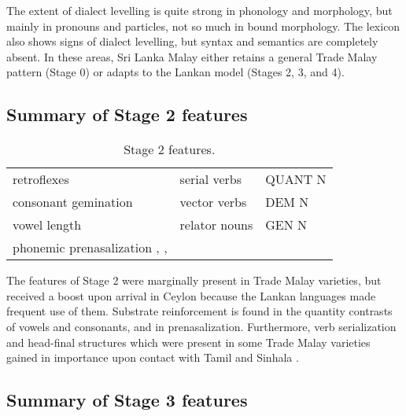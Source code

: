 The extent of dialect levelling is quite strong in phonology and morphology, but mainly in pronouns and particles, not so much in bound morphology. The lexicon also shows signs of dialect levelling, but syntax and semantics are completely absent. In these areas, Sri Lanka Malay either retains a general Trade Malay pattern (Stage 0) or   adapts to the Lankan model (Stages 2, 3, and 4).


\subsection{Summary of Stage 2 features}

\begin{table}[h!]
\centering
\begin{tabular}{p{4cm}p{4cm}p{4cm}} 
retroflexes& serial verbs  & QUANT N  \\
consonant gemination 		& vector verbs         & DEM N \\
vowel length			&  relator nouns         & GEN N \\ 
phonemic prenasalization \umb{}, \und{}, \ung{} & & \\
\end{tabular}
\caption{Stage 2 features.} 
\end{table}

The features of Stage 2 were marginally present in Trade Malay varieties, but received a boost upon arrival in Ceylon because the Lankan languages made frequent use of them.
Substrate reinforcement is found in the quantity contrasts of vowels and consonants, and in prenasalization. Furthermore, verb serialization and head-final structures which were present in some Trade Malay varieties gained in importance upon contact with Tamil and Sinhala \citep{Nordhofffcsvc}.

\subsection{Summary of Stage 3 features}


